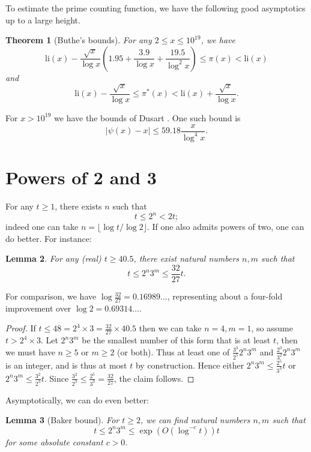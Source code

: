 \documentclass[12pt,a4paper,reqno]{amsart}
\numberwithin{equation}{section}
\theoremstyle{plain}
\newtheorem{theorem}{Theorem}[section]
\newtheorem{lemma}[theorem]{Lemma}
\theoremstyle{definition}
\begin{document}
To estimate the prime counting function, we have the following good asymptotics up to a large height.

  \begin{theorem}[Buthe's bounds]\cite{buthe}  For any $2 \leq x \leq 10^{19}$, we have
  $$ \mathrm{li}(x) - \frac{\sqrt{x}}{\log x}\left(1.95 + \frac{3.9}{\log x} + \frac{19.5}{\log^2 x}\right) \leq \pi(x) < \mathrm{li}(x)$$
  and
  $$ \mathrm{li}(x) - \frac{\sqrt{x}}{\log x} \leq \pi^*(x) < \mathrm{li}(x) + \frac{\sqrt{x}}{{\log x}}.$$
  \end{theorem}
  
  For $x > 10^{19}$ we have the bounds of Dusart \cite{dusart}.  One such bound is
  $$ |\psi(x) - x| \leq 59.18 \frac{x}{\log^4 x}.$$

\section{Powers of 2 and 3}

For any $t \geq 1$, there exists $n$ such that
$$ t \leq 2^n < 2t;$$
indeed one can take $n = \lfloor \log t / \log 2 \rfloor$.  If one also admits powers of two, one can do better.  For instance: 

\begin{lemma}\label{lemcount-0}  For any (real) $t \geq 40.5$, there exist natural numbers $n,m$ such that
  $$ t \leq 2^n 3^m \leq \frac{32}{27} t.$$
\end{lemma}

For comparison, we have $\log \frac{32}{27} = 0.16989\dots$, representing about a four-fold improvement over $\log 2 = 0.69314\dots$.

\begin{proof}  If $t \leq 48 = 2^4 \times 3 = \frac{32}{27} \times 40.5$ then we can take $n=4, m=1$, so assume $t > 2^4 \times 3$.  Let $2^n 3^m$ be the smallest number of this form that is at least $t$, then we must have $n \geq 5$ or $m \geq 2$ (or both).  Thus at least one of $\frac{3^3}{2^5} 2^n 3^m$ and $\frac{2^3}{3^2} 2^n 3^m$ is an integer, and is thus at most $t$ by construction.  Hence either $2^n 3^m \leq \frac{2^5}{3^3} t$ or $2^n 3^m \leq \frac{3^2}{2^3} t$.  Since $\frac{3^2}{2^3} \leq \frac{2^5}{3^3} = \frac{32}{27}$, the claim follows.
\end{proof}


Asymptotically, we can do even better:

\begin{lemma}[Baker bound]\label{baker} For $t \geq 2$, we can find natural numbers $n,m$ such that
  $$ t \leq 2^n 3^m \leq \exp(O(\log^{-c} t)) t$$
for some absolute constant $c>0$.
\end{lemma}
\end{document}
